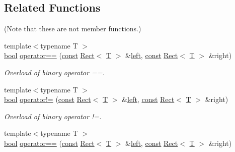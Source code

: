 \subsection*{Related Functions}
(Note that these are not member functions.) \begin{DoxyCompactItemize}
\item 
{\footnotesize template$<$typename T $>$ }\\\hyperlink{term__entry_8h_a002004ba5d663f149f6c38064926abac}{bool} \hyperlink{classsf_1_1_rect_ab3488b5dbd0e587c4d7cb80605affc46}{operator==} (\hyperlink{term__entry_8h_a57bd63ce7f9a353488880e3de6692d5a}{const} \hyperlink{classsf_1_1_rect}{Rect}$<$ \hyperlink{curses_8priv_8h_a5ef253115820acf7d27f3c5c3b02a0f0}{T} $>$ \&\hyperlink{classsf_1_1_rect_aa49960fa465103d9cb7069ceb25c7c32}{left}, \hyperlink{term__entry_8h_a57bd63ce7f9a353488880e3de6692d5a}{const} \hyperlink{classsf_1_1_rect}{Rect}$<$ \hyperlink{curses_8priv_8h_a5ef253115820acf7d27f3c5c3b02a0f0}{T} $>$ \&right)
\begin{DoxyCompactList}\small\item\em Overload of binary operator ==. \end{DoxyCompactList}\item 
{\footnotesize template$<$typename T $>$ }\\\hyperlink{term__entry_8h_a002004ba5d663f149f6c38064926abac}{bool} \hyperlink{classsf_1_1_rect_a03fc4c105687b7d0f07b6b4ed4b45581}{operator!=} (\hyperlink{term__entry_8h_a57bd63ce7f9a353488880e3de6692d5a}{const} \hyperlink{classsf_1_1_rect}{Rect}$<$ \hyperlink{curses_8priv_8h_a5ef253115820acf7d27f3c5c3b02a0f0}{T} $>$ \&\hyperlink{classsf_1_1_rect_aa49960fa465103d9cb7069ceb25c7c32}{left}, \hyperlink{term__entry_8h_a57bd63ce7f9a353488880e3de6692d5a}{const} \hyperlink{classsf_1_1_rect}{Rect}$<$ \hyperlink{curses_8priv_8h_a5ef253115820acf7d27f3c5c3b02a0f0}{T} $>$ \&right)
\begin{DoxyCompactList}\small\item\em Overload of binary operator !=. \end{DoxyCompactList}\item 
{\footnotesize template$<$typename T $>$ }\\\hyperlink{term__entry_8h_a002004ba5d663f149f6c38064926abac}{bool} \hyperlink{classsf_1_1_rect_ab3488b5dbd0e587c4d7cb80605affc46}{operator==} (\hyperlink{term__entry_8h_a57bd63ce7f9a353488880e3de6692d5a}{const} \hyperlink{classsf_1_1_rect}{Rect}$<$ \hyperlink{curses_8priv_8h_a5ef253115820acf7d27f3c5c3b02a0f0}{T} $>$ \&\hyperlink{classsf_1_1_rect_aa49960fa465103d9cb7069ceb25c7c32}{left}, \hyperlink{term__entry_8h_a57bd63ce7f9a353488880e3de6692d5a}{const} \hyperlink{classsf_1_1_rect}{Rect}$<$ \hyperlink{curses_8priv_8h_a5ef253115820acf7d27f3c5c3b02a0f0}{T} $>$ \&right)

\end{DoxyCompactItemize}
